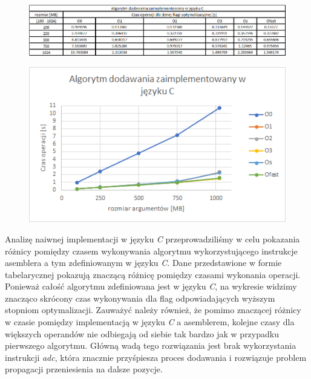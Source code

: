 \documentclass{article}
\begin{document}
\newpage{}

\begin{figure}[h!]

\includegraphics[scale=0.65]{charts/add_c.png}

\end{figure}

\begin{figure}[h!]
\centering
\includegraphics[scale=0.75]{charts/add_c_p.png}

\end{figure}

\vspace{5mm}

Analizę naiwnej implementacji w języku \textit{C} przeprowadziliśmy w celu pokazania różnicy pomiędzy czasem wykonywania algorytmu wykorzystującego instrukcje asemblera a tym zdefiniowanym w języku \textit{C}. Dane przedstawione w formie tabelarycznej pokazują znaczącą różnicę pomiędzy czasami wykonania operacji. Ponieważ całość algorytmu zdefiniowana jest w języku \textit{C}, na wykresie widzimy znacząco skrócony czas wykonywania dla flag odpowiadających wyższym stopniom optymalizacji. Zauważyć należy również, że pomimo znaczącej różnicy w czasie pomiędzy implementacją w języku \textit{C} a asemblerem, kolejne czasy dla większych operandów nie odbiegają od siebie tak bardzo jak w przypadku pierwszego algorytmu.
Główną wadą tego rozwiązania jest brak wykorzystania instrukcji \textit{adc}, która znacznie przyśpiesza proces dodawania i rozwiązuje problem propagacji przeniesienia na dalsze pozycje.
\end{document}
